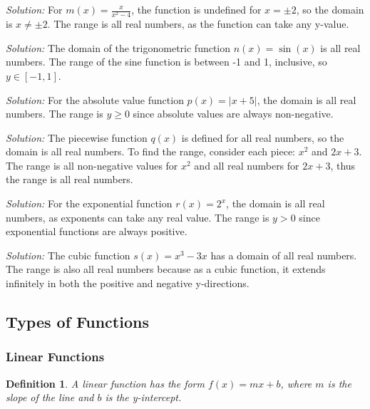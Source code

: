 \documentclass[a4paper,12pt]{book}
\newenvironment{solution}[1][]
{\par\noindent\textit{Solution:} \rmfamily}{\medskip}
\newtheorem{definition}{Definition}
\begin{document}
\begin{solution}[5]
For \( m(x) = \frac{x}{x^2 - 4} \), the function is undefined for \( x = \pm 2 \), so the domain is \( x \neq \pm 2 \). The range is all real numbers, as the function can take any y-value.
\end{solution}

\begin{solution}[6]
The domain of the trigonometric function \( n(x) = \sin(x) \) is all real numbers. The range of the sine function is between -1 and 1, inclusive, so \( y \in [-1, 1] \).
\end{solution}

\begin{solution}[7]
For the absolute value function \( p(x) = |x + 5| \), the domain is all real numbers. The range is \( y \geq 0 \) since absolute values are always non-negative.
\end{solution}

\begin{solution}[8]
The piecewise function \( q(x) \) is defined for all real numbers, so the domain is all real numbers. To find the range, consider each piece: \( x^2 \) and \( 2x + 3 \). The range is all non-negative values for \( x^2 \) and all real numbers for \( 2x + 3 \), thus the range is all real numbers.
\end{solution}

\begin{solution}[9]
For the exponential function \( r(x) = 2^x \), the domain is all real numbers, as exponents can take any real value. The range is \( y > 0 \) since exponential functions are always positive.
\end{solution}

\begin{solution}[10]
The cubic function \( s(x) = x^3 - 3x \) has a domain of all real numbers. The range is also all real numbers because as a cubic function, it extends infinitely in both the positive and negative y-directions.
\end{solution}


\subsection{Types of Functions}
\subsubsection{Linear Functions}
\begin{definition}
A linear function has the form \( f(x) = mx + b \), where \( m \) is the slope of the line and \( b \) is the y-intercept.
\end{definition}
\end{document}

